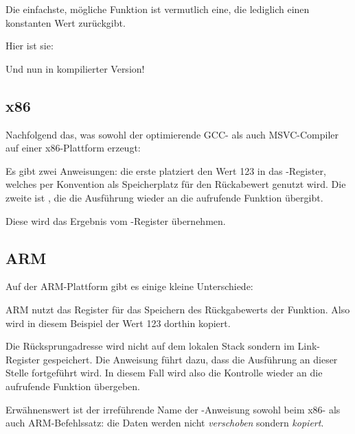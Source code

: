 
Die einfachste, mögliche Funktion ist vermutlich eine, die lediglich einen konstanten Wert zurückgibt.

Hier ist sie:



Und nun in kompilierter Version!

\subsection{x86}

Nachfolgend das, was sowohl der optimierende GCC- als auch MSVC-Compiler auf einer x86-Plattform erzeugt:



Es gibt zwei Anweisungen: die erste platziert den Wert 123 in das \EAX-Register, welches per Konvention
als Speicherplatz für den Rückabewert genutzt wird. Die zweite ist \RET, die die Ausführung wieder an
die aufrufende Funktion übergibt.

Diese wird das Ergebnis vom \EAX-Register übernehmen.

\subsection{ARM}

Auf der ARM-Plattform gibt es einige kleine Unterschiede:



ARM nutzt das Register  für das Speichern des Rückgabewerts der Funktion. Also wird in diesem Beispiel
der Wert 123 dorthin kopiert.

Die Rücksprungadresse wird nicht auf dem lokalen Stack sondern im Link-Register gespeichert.
Die Anweisung  führt dazu, dass die Ausführung an dieser Stelle fortgeführt wird. In diesem Fall wird
also die Kontrolle wieder an die aufrufende Funktion übergeben.

Erwähnenswert ist der irreführende Name der \MOV-Anweisung sowohl beim x86- als auch ARM-Befehlssatz:
die Daten werden nicht \emph{verschoben} sondern \emph{kopiert}.

